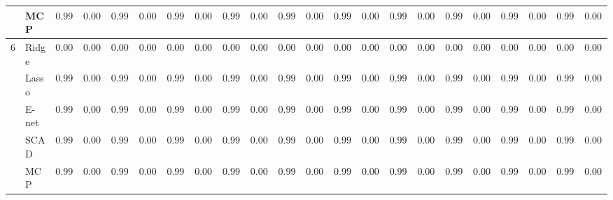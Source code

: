 \begin{tabular}{p{0.2cm}p{1cm}|p{0.6cm}p{0.6cm}|p{0.6cm}p{0.6cm}p{0.6cm}p{0.6cm}p{0.6cm}p{0.6cm}|p{0.6cm}p{0.6cm}p{0.6cm}p{0.6cm}p{0.6cm}p{0.6cm}|p{0.6cm}p{0.6cm}p{0.6cm}p{0.6cm}p{0.6cm}p{0.6cm}}
 & MCP  & $0.9993$ & $0.0010$ & $0.9994$ & $0.0008$ & $0.9996$ & $0.0006$ & $0.9998$ & $0.0004$ & $0.9994$ & $0.0009$ & $0.9988$ & $0.0015$ & $0.9995$ & $0.0009$ & $0.9995$ & $0.0008$ & $0.9996$ & $0.0008$ & $0.9996$ & $0.0008$ \\\hline
6 & Ridge  & $0.0000$ & $0.0000$ & $0.0000$ & $0.0000$ & $0.0000$ & $0.0000$ & $0.0000$ & $0.0000$ & $0.0000$ & $0.0000$ & $0.0000$ & $0.0000$ & $0.0000$ & $0.0000$ & $0.0000$ & $0.0000$ & $0.0000$ & $0.0000$ & $0.0000$ & $0.0000$ \\
 & Lasso  & $0.9976$ & $0.0023$ & $0.9962$ & $0.0029$ & $0.9964$ & $0.0030$ & $0.9958$ & $0.0020$ & $0.9976$ & $0.0027$ & $0.9987$ & $0.0021$ & $0.9994$ & $0.0014$ & $0.9972$ & $0.0028$ & $0.9984$ & $0.0030$ & $0.9987$ & $0.0013$ \\
 & E-net  & $0.9972$ & $0.0025$ & $0.9958$ & $0.0030$ & $0.9955$ & $0.0030$ & $0.9924$ & $0.0023$ & $0.9975$ & $0.0023$ & $0.9986$ & $0.0022$ & $0.9987$ & $0.0027$ & $0.9971$ & $0.0026$ & $0.9983$ & $0.0029$ & $0.9969$ & $0.0017$ \\
 & SCAD  & $0.9972$ & $0.0033$ & $0.9972$ & $0.0026$ & $0.9982$ & $0.0021$ & $0.9989$ & $0.0021$ & $0.9971$ & $0.0029$ & $0.9960$ & $0.0032$ & $0.9985$ & $0.0028$ & $0.9970$ & $0.0031$ & $0.9973$ & $0.0025$ & $0.9990$ & $0.0019$ \\
 & MCP  & $0.9993$ & $0.0010$ & $0.9994$ & $0.0008$ & $0.9996$ & $0.0006$ & $0.9998$ & $0.0004$ & $0.9994$ & $0.0009$ & $0.9988$ & $0.0015$ & $0.9995$ & $0.0009$ & $0.9995$ & $0.0008$ & $0.9996$ & $0.0008$ & $0.9996$ & $0.0008$ \\
\hline 
\end{tabular}

